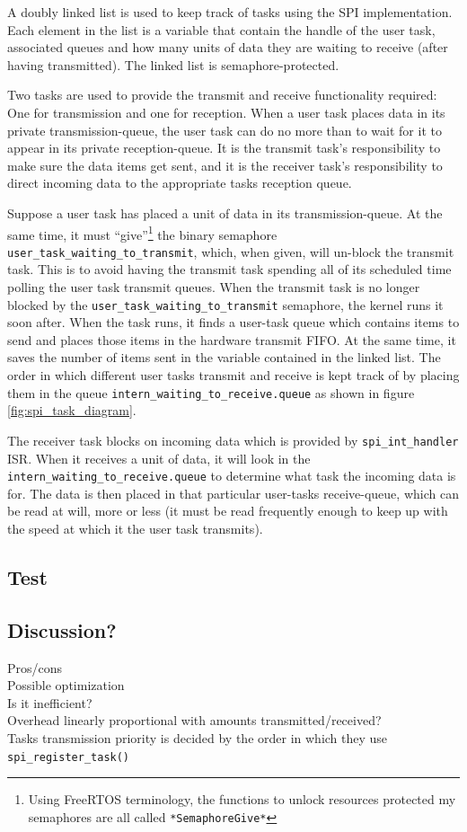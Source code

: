 A doubly linked list is used to keep track of tasks using the SPI implementation. Each element in the list is a variable that contain the handle of the user task, associated queues and how many units of data they are waiting to receive (after having transmitted). The linked list is semaphore-protected.

Two tasks are used to provide the transmit and receive functionality required: One for transmission and one for reception. When a user task places data in its private transmission-queue, the user task can do no more than to wait for it to appear in its private reception-queue. It is the transmit task's responsibility to make sure the data items get sent, and it is the receiver task's responsibility to direct incoming data to the appropriate tasks reception queue.

Suppose a user task has placed a unit of data in its transmission-queue. At the same time, it must ``give''\footnote{Using FreeRTOS terminology, the functions to unlock resources protected my semaphores are all called \texttt{*SemaphoreGive*}} the binary semaphore \texttt{user\_task\_waiting\_to\_transmit}, which, when given, will un-block the transmit task. This is to avoid having the transmit task spending all of its scheduled time polling the user task transmit queues. When the transmit task is no longer blocked by the \texttt{user\_task\_waiting\_to\_transmit} semaphore, the kernel runs it soon after. When the task runs, it finds a user-task queue which contains items to send and places those items in the hardware transmit FIFO. At the same time, it saves the number of items sent in the variable contained in the linked list. The order in which different user tasks transmit and receive is kept track of by placing them in the queue \texttt{intern\_waiting\_to\_receive.queue} as shown in figure \ref{fig:spi_task_diagram}.

The receiver task blocks on incoming data which is provided by \texttt{spi\_int\_handler} ISR. When it receives a unit of data, it will look in the \texttt{intern\_waiting\_to\_receive.queue} to determine what task the incoming data is for. The data is then placed in that particular user-tasks receive-queue, which can be read at will, more or less (it must be read frequently enough to keep up with the speed at which it the user task transmits).




\subsection{Test}


\subsection{Discussion?}
Pros/cons\\
Possible optimization\\
Is it inefficient?\\
Overhead linearly proportional with amounts transmitted/received?\\
Tasks transmission priority is decided by the order in which they use \texttt{spi\_register\_task()}
